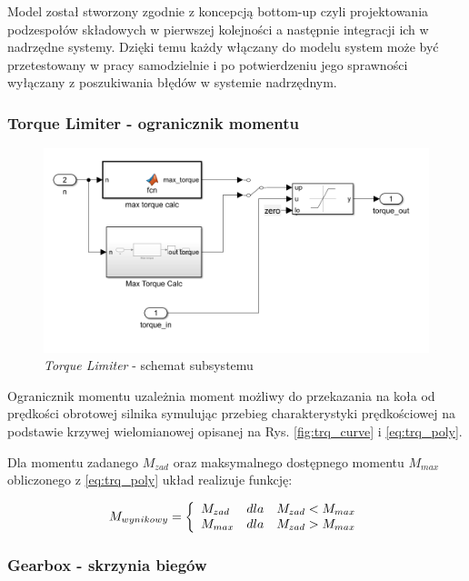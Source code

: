 \documentclass[12pt, a4paper, headings=normal]{article}
\begin{document}
\bigskip

Model został stworzony zgodnie z koncepcją bottom-up czyli projektowania podzespołów
składowych w pierwszej kolejności a następnie integracji ich w nadrzędne systemy. 
Dzięki temu każdy włączany do modelu system może być przetestowany w pracy samodzielnie
i po potwierdzeniu jego sprawności wyłączany z poszukiwania błędów w systemie nadrzędnym.

\subsubsection{Torque Limiter - ogranicznik momentu}

\begin{figure}[H]
	\centering
	\includegraphics[width=.8\textwidth]{torquelimiter.png}
	\caption{\textit{Torque Limiter} - schemat subsystemu}
	\label{fig:torquelimiter}
\end{figure}

Ogranicznik momentu uzależnia moment możliwy do przekazania na koła od prędkości
obrotowej silnika symulując przebieg charakterystyki prędkościowej na podstawie
krzywej wielomianowej opisanej na Rys. \ref{fig:trq_curve} i \eqref{eq:trq_poly}.

Dla momentu zadanego $M_{zad}$ oraz maksymalnego dostępnego momentu $M_{max}$ obliczonego
z \eqref{eq:trq_poly} układ realizuje funkcję:

\begin{equation}
	M_{wynikowy} = \left\{ \begin{array}{l c r}
		M_{zad} & dla & M_{zad} < M_{max} \\
		M_{max} & dla & M_{zad} > M_{max} \\
	\end{array}\right.
\end{equation}

\subsubsection{Gearbox - skrzynia biegów}
\end{document}
